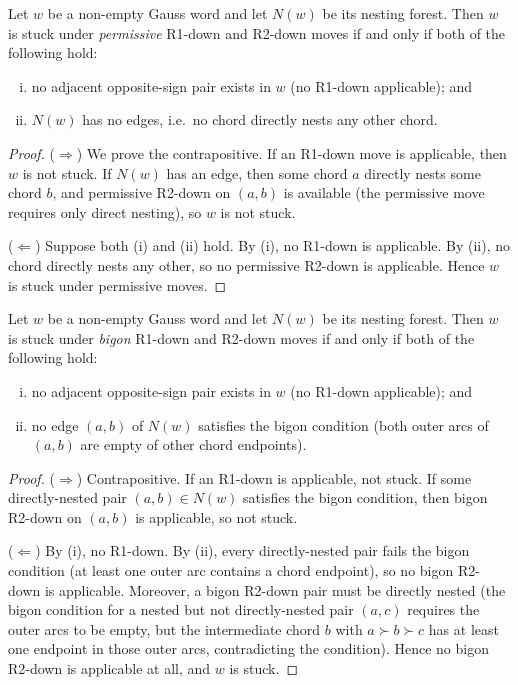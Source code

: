 
\begin{theorem}
\label{thm:stuck-permissive}
Let $w$ be a non-empty Gauss word and let $N(w)$ be its nesting
forest. Then $w$ is stuck under \emph{permissive} R1-down and R2-down
moves if and only if both of the following hold:
\begin{enumerate}[(i)]
\item no adjacent opposite-sign pair exists in $w$ (no R1-down
  applicable); and
\item $N(w)$ has no edges, i.e.\ no chord directly nests any other
  chord.
\end{enumerate}
\end{theorem}

\begin{proof}
($\Rightarrow$) We prove the contrapositive. If an R1-down move is
applicable, then $w$ is not stuck. If $N(w)$ has an edge, then some
chord $a$ directly nests some chord $b$, and permissive R2-down on
$(a, b)$ is available (the permissive move requires only direct
nesting), so $w$ is not stuck.

($\Leftarrow$) Suppose both (i) and (ii) hold. By (i), no R1-down is
applicable. By (ii), no chord directly nests any other, so no
permissive R2-down is applicable. Hence $w$ is stuck under permissive
moves.
\end{proof}

\begin{theorem}
\label{thm:stuck-bigon}
Let $w$ be a non-empty Gauss word and let $N(w)$ be its nesting
forest. Then $w$ is stuck under \emph{bigon} R1-down and R2-down
moves if and only if both of the following hold:
\begin{enumerate}[(i)]
\item no adjacent opposite-sign pair exists in $w$ (no R1-down
  applicable); and
\item no edge $(a, b)$ of $N(w)$ satisfies the bigon condition
  (both outer arcs of $(a, b)$ are empty of other chord endpoints).
\end{enumerate}
\end{theorem}

\begin{proof}
($\Rightarrow$) Contrapositive. If an R1-down is applicable, not
stuck. If some directly-nested pair $(a, b) \in N(w)$ satisfies the
bigon condition, then bigon R2-down on $(a, b)$ is applicable, so not
stuck.

($\Leftarrow$) By (i), no R1-down. By (ii), every directly-nested
pair fails the bigon condition (at least one outer arc contains a
chord endpoint), so no bigon R2-down is applicable. Moreover, a
bigon R2-down pair must be directly nested (the bigon condition for
a nested but not directly-nested pair $(a, c)$ requires the outer
arcs to be empty, but the intermediate chord $b$ with $a \succ b \succ
c$ has at least one endpoint in those outer arcs, contradicting the
condition). Hence no bigon R2-down is applicable at all, and $w$ is
stuck.
\end{proof}

